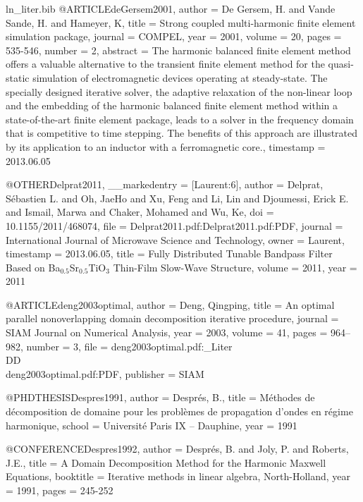 \begin{filecontents*}{ln_liter.bib}
@ARTICLE{deGersem2001,
  author = {De Gersem, H. and Vande Sande, H. and Hameyer, K},
  title = {Strong coupled multi-harmonic finite element simulation package},
  journal = {COMPEL},
  year = {2001},
  volume = {20},
  pages = {535-546},
  number = {2},
  abstract = {The harmonic balanced finite element method offers a valuable alternative
	to the transient finite element method for the quasi-static simulation
	of electromagnetic devices operating at steady-state. The specially
	designed iterative solver, the adaptive relaxation of the non-linear
	loop and the embedding of the harmonic balanced finite element method
	within a state-of-the-art finite element package, leads to a solver
	in the frequency domain that is competitive to time stepping. The
	benefits of this approach are illustrated by its application to an
	inductor with a ferromagnetic core.},
  timestamp = {2013.06.05}
}

@OTHER{Delprat2011,
  __markedentry = {[Laurent:6]},
  author = {Delprat, S\'ebastien L. and Oh, JaeHo and Xu, Feng and Li, Lin and
	Djoumessi, Erick E. and Ismail, Marwa and Chaker, Mohamed and Wu,
	Ke},
  doi = {10.1155/2011/468074},
  file = {Delprat2011.pdf:Delprat2011.pdf:PDF},
  journal = {International Journal of Microwave Science and Technology},
  owner = {Laurent},
  timestamp = {2013.06.05},
  title = {Fully Distributed Tunable Bandpass Filter Based on {Ba$_{0.5}$Sr$_{0.5}$TiO$_3$}
	Thin-Film Slow-Wave Structure},
  volume = {2011},
  year = {2011}
}

@ARTICLE{deng2003optimal,
  author = {Deng, Qingping},
  title = {An optimal parallel nonoverlapping domain decomposition iterative
	procedure},
  journal = {SIAM Journal on Numerical Analysis},
  year = {2003},
  volume = {41},
  pages = {964--982},
  number = {3},
  file = {deng2003optimal.pdf:_Liter\\DD\\deng2003optimal.pdf:PDF},
  publisher = {SIAM}
}

@PHDTHESIS{Despres1991,
  author = {Despr{\'e}s, B.},
  title = {M{\'e}thodes de d{\'e}composition de domaine pour les probl{\`e}mes
	de propagation d'ondes en r{\'e}gime harmonique},
  school = {Universit{\'e} Paris IX -- Dauphine},
  year = {1991}
}

@CONFERENCE{Despres1992,
  author = {Despr{\'e}s, B. and Joly, P. and Roberts, J.E.},
  title = {A Domain Decomposition Method for the Harmonic {M}axwell Equations},
  booktitle = {Iterative methods in linear algebra, North-Holland},
  year = {1991},
  pages = {245-252}
}


\end{filecontents*}
